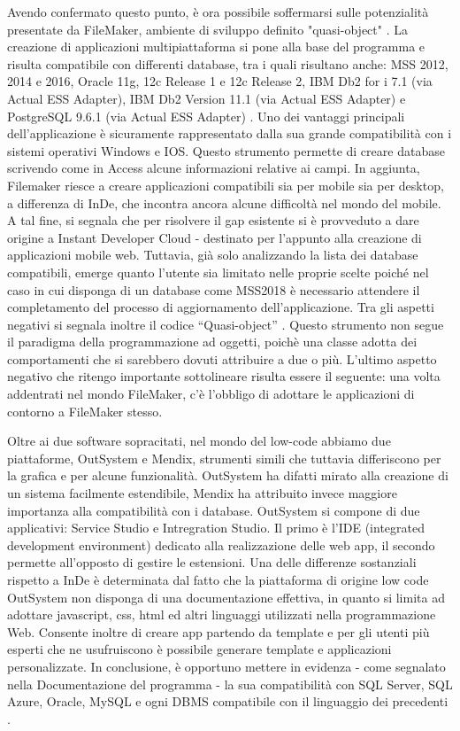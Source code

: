 Avendo confermato questo punto, è ora possibile soffermarsi sulle potenzialità presentate da FileMaker, ambiente di sviluppo definito "quasi-object" \cite{[21]}. 
La creazione di applicazioni multipiattaforma si pone alla base del programma e risulta compatibile con differenti database, tra i quali risultano anche: MSS 2012, 2014 e 2016, 
Oracle 11g, 12c Release 1 e 12c Release 2, IBM Db2 for i 7.1 (via Actual ESS Adapter), IBM Db2 Version 11.1 (via Actual ESS Adapter) e PostgreSQL 9.6.1 (via Actual ESS Adapter) \cite{[24]}.
Uno dei vantaggi principali dell’applicazione è sicuramente rappresentato dalla sua grande compatibilità con i sistemi operativi Windows e IOS. 
Questo strumento permette di creare database scrivendo come in Access alcune informazioni relative ai campi. In aggiunta, Filemaker riesce a creare applicazioni compatibili sia per mobile sia per desktop, a differenza di InDe, che incontra ancora alcune difficoltà nel mondo del mobile.
A tal fine, si segnala che per risolvere il gap esistente si è provveduto a dare origine a Instant Developer Cloud - destinato per l'appunto alla creazione di applicazioni mobile web.
Tuttavia, già solo analizzando la lista dei database compatibili, emerge quanto l'utente sia limitato nelle proprie scelte poiché nel caso in cui disponga di un database come MSS2018 è necessario attendere il completamento del processo di aggiornamento dell’applicazione. 
Tra gli aspetti negativi si segnala inoltre il codice “Quasi-object” . Questo strumento non segue il paradigma della programmazione ad oggetti, poichè una classe adotta dei comportamenti che si sarebbero dovuti attribuire a due o più.
L'ultimo aspetto negativo che ritengo importante sottolineare risulta essere il seguente: una volta addentrati nel mondo FileMaker, c’è l’obbligo di adottare le applicazioni di contorno a FileMaker stesso. 

Oltre ai due software sopracitati, nel mondo del low-code abbiamo due piattaforme, OutSystem e Mendix, strumenti simili che tuttavia differiscono per la grafica e per alcune funzionalità. 
OutSystem ha difatti mirato alla creazione di un sistema facilmente estendibile, Mendix ha attribuito invece maggiore importanza alla compatibilità con i database.
OutSystem si compone di due applicativi: Service Studio e Intregration Studio. Il primo è l’IDE (integrated development environment) dedicato alla realizzazione delle web app, il secondo permette all'opposto di gestire le estensioni.
Una delle differenze sostanziali rispetto a InDe è determinata dal fatto che la piattaforma di origine low code OutSystem non disponga di una documentazione effettiva, in quanto si limita ad adottare javascript, css, html ed altri linguaggi utilizzati nella programmazione Web. 
Consente inoltre di creare app partendo da template e per gli utenti più esperti che ne usufruiscono è possibile generare template e applicazioni personalizzate.
In conclusione, è opportuno mettere in evidenza - come segnalato nella Documentazione del programma - la sua compatibilità con SQL Server, SQL Azure, Oracle, MySQL e ogni DBMS compatibile con il linguaggio dei precedenti \cite{[25]}. 

